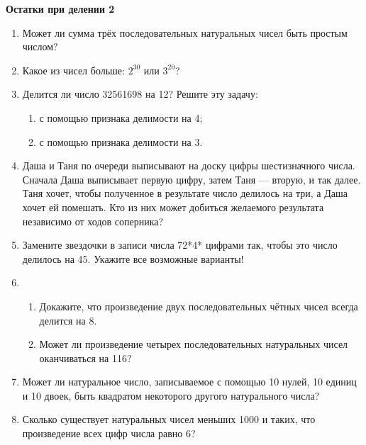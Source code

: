 \documentclass{article}
\begin{document}
\large
	
\begin{center}
	\textbf{Остатки при делении 2}
\end{center}


\begin{enumerate}[label*=\protect\fbox{\arabic{enumi}}]

\item Может ли сумма трёх последовательных натуральных чисел быть простым числом?

\item Какое из чисел больше: $2^{30}$ или $3^{20}$?


\item Делится ли число 32561698 на 12? Решите эту задачу:
\begin{enumerate}
\item с помощью признака делимости на 4;
\item с помощью признака делимости на 3.
\end{enumerate}

\item Даша и Таня по очереди выписывают на доску цифры шестизначного числа. Сначала Даша выписывает первую цифру, затем Таня — вторую, и так далее. Таня хочет, чтобы полученное в результате число делилось на три, а Даша хочет ей помешать. Кто из них может добиться желаемого результата независимо от ходов соперника?

\item Замените звездочки в записи числа 72*4* цифрами так, чтобы это число делилось на 45. Укажите все возможные варианты!

\item 
\begin{enumerate}
	\item Докажите, что произведение двух последовательных чётных чисел всегда делится на 8.
	
	\item Может ли произведение четырех последовательных натуральных чисел оканчиваться на 116?
	
\end{enumerate}


\item Может ли натуральное число, записываемое с помощью 10 нулей, 10 единиц и 10 двоек, быть квадратом некоторого другого натурального числа?

\item Сколько существует натуральных чисел меньших 1000 и таких, что произведение всех цифр числа равно 6?

\end{enumerate}
\end{document}
